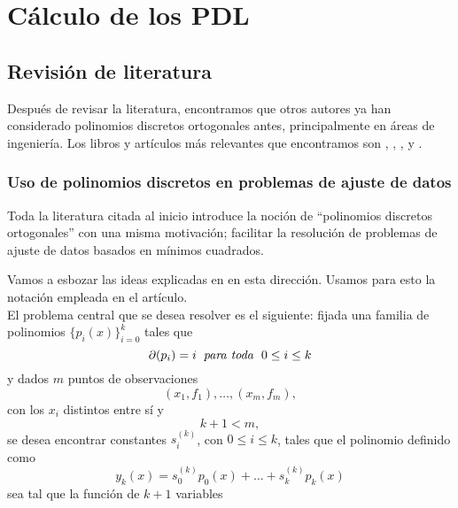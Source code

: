 \chapter{Cálculo de los PDL}

\section{Revisión de literatura}
Después de revisar la literatura, encontramos que
otros autores ya han considerado polinomios discretos ortogonales
antes, principalmente en áreas de ingeniería.
Los libros y artículos más relevantes
que encontramos son
\cite{Neuman}, \cite{papel}, \cite{george},
\cite{himmelblau}
y \cite{rabin}. 


\subsection{Uso de polinomios discretos en problemas de ajuste de datos}
\label{subsec: ajuste de datos}
Toda la literatura citada al inicio introduce
la noción de ``polinomios discretos ortogonales''
con una misma motivación; facilitar la resolución
de problemas de ajuste de datos basados en mínimos cuadrados.

Vamos a esbozar las ideas explicadas en
\cite{george} en esta dirección. Usamos
para esto la notación empleada
en el artículo. \\

El problema central que se desea resolver es
el siguiente:
fijada una familia de polinomios
$\{ p_{i}(x) \}_{i= 0}^{k}$ tales que
\begin{equation}
\label{ec: george 14}
\partial (p_{i}) = i \hspace{0.2cm}
\textit{para toda } \hspace{0.1cm} 0 \leq i \leq k
\end{equation}
y
dados $m$ puntos de observaciones
\[
(x_{1}, f_{1}), \ldots , (x_{m}, f_{m}),
\]
con los $x_{i}$ distintos entre sí y 
\begin{equation}
\label{eq0: 7May}
k+1 < m, 
\end{equation}
se desea encontrar
constantes $s_{i}^{(k)}$,
con $0 \leq i \leq k$, tales que 
el polinomio definido como
\[
y_{k}(x) = s_{0}^{(k)} p_{0}(x) + \ldots +  
s_{k}^{(k)} p_{k}(x) 
\]
sea tal que 
la función de $k+1$ variables

